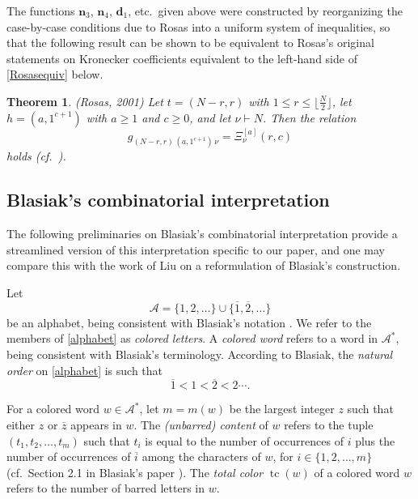 \documentclass[12pt]{article}
\newtheorem{theorem}{Theorem}
\begin{document}
 The functions $\mathbf n_3$, $\mathbf n_4$, $\mathbf d_1$, etc.\ given above were constructed by reorganizing the case-by-case 
 conditions due to Rosas \cite[Corollary 3 and Theorem 4]{Rosas2001} into a uniform system of inequalities, so that the 
 following result can be shown to be equivalent to Rosas's original statements on Kronecker coefficients equivalent to 
 the left-hand side of \eqref{Rosasequiv} below. 

\begin{theorem}
 (Rosas, 2001) Let $t = (N-r,r)$ with $1 \leq r \leq \lfloor \frac{N}{2} \rfloor$, let $h = (a, 1^{c+1})$ with $a \geq 1$ and $c \geq 0$, 
 and let $\nu \vdash N$. 
 Then the relation 
\begin{equation}\label{Rosasequiv}
 g_{(N-r,r) \, (a, 1^{c+1}) \, \nu } = {\Xi}_{\nu}^{[a]}(r,c) 
\end{equation}
 holds (cf.\ \cite[Corollary 3 and Theorem 4]{Rosas2001}).
\end{theorem}

\subsection{Blasiak's combinatorial interpretation}\label{secBlasiakinter}
 The following preliminaries on Blasiak's combinatorial interpretation provide a streamlined version of this interpretation specific to our 
 paper, and one may compare this with the work of Liu \cite{Liu2017} on a reformulation of Blasiak's construction. 

 Let 
\begin{equation}\label{alphabet}
 \mathcal{A} = \{ 1, 2, \ldots \} \cup \{ \overline{1}, \overline{2}, \ldots \} 
\end{equation}
 be an alphabet, being consistent with Blasiak's notation \cite{Blasiak20162018}. We refer to the members of \eqref{alphabet} as 
 \emph{colored letters}. A \emph{colored word} refers to a word in $\mathcal{A}^{\ast}$, being consistent with Blasiak's terminology. 
 According to Blasiak, the \emph{natural order} on \eqref{alphabet} is such that 
\begin{equation}\label{linearorder}
 \overline{1} < 1 < \overline{2} < 2 \cdots. 
\end{equation} 
 
 For a colored word $w \in \mathcal{A}^{\ast}$, let $m = m(w)$ be the largest integer $z$ such that either $z$ or $\overline{z}$ appears in 
 $w$. The \emph{(unbarred) content} of $w$ refers to the tuple $(t_1, t_{2}, \ldots, t_{m})$ such that $t_i$ is equal to the number of 
 occurrences of $i$ plus the number of occurrences of $\overline{i}$ among the characters of $w$, for $i \in \{ 1, 2, \ldots, m \}$
 (cf.\ Section 2.1 in Blasiak's paper \cite{Blasiak20162018}). The \emph{total color} 
 $\operatorname{tc}(w)$ of a colored word $w$ refers to the number of barred letters in $w$. 
\end{document}
